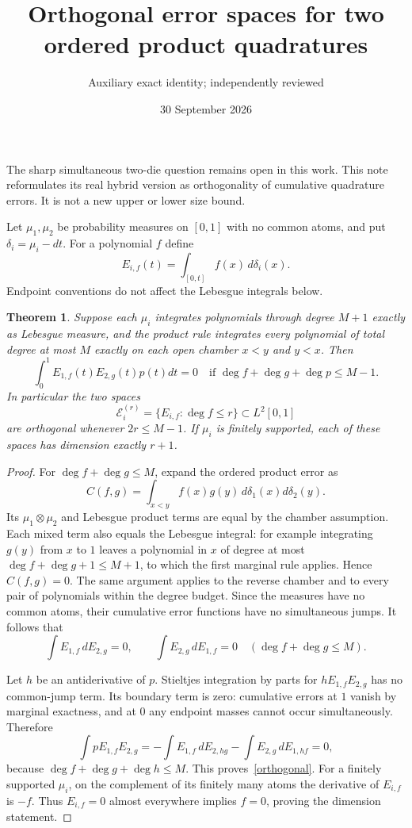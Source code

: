 \documentclass[11pt]{article}
\title{Orthogonal error spaces for two ordered product quadratures}
\author{Auxiliary exact identity; independently reviewed}\date{30 September 2026}
\newtheorem{theorem}{Theorem}\newtheorem{corollary}{Corollary}
\begin{document}
\maketitle
The sharp simultaneous two-die question remains open in this work.
This note reformulates its real hybrid version as orthogonality of
cumulative quadrature errors. It is not a new upper or lower size bound.

Let $\mu_1,\mu_2$ be probability measures on $[0,1]$ with no common
atoms, and put $\delta_i=\mu_i-dt$. For a polynomial $f$ define
\[
 E_{i,f}(t)=\int_{[0,t]}f(x)\,d\delta_i(x).
\]
Endpoint conventions do not affect the Lebesgue integrals below.

\begin{theorem}\label{main}
Suppose each $\mu_i$ integrates polynomials through degree $M+1$
exactly as Lebesgue measure, and the product rule integrates every
polynomial of total degree at most $M$ exactly on each open chamber
$x<y$ and $y<x$. Then
\begin{equation}\label{orthogonal}
 \int_0^1 E_{1,f}(t)E_{2,g}(t)p(t)dt=0
 \quad\text{if }\deg f+\deg g+\deg p\le M-1.
\end{equation}
In particular the two spaces
\[
 \mathcal E_i^{(r)}=\{E_{i,f}:\deg f\le r\}\subset L^2[0,1]
\]
are orthogonal whenever $2r\le M-1$. If $\mu_i$ is finitely supported,
each of these spaces has dimension exactly $r+1$.
\end{theorem}
\begin{proof}
For $\deg f+\deg g\le M$, expand the ordered product error as
\[
 C(f,g)=\int_{x<y}f(x)g(y)\,d\delta_1(x)d\delta_2(y).
\]
Its $\mu_1\otimes\mu_2$ and Lebesgue product terms are equal by the
chamber assumption. Each mixed term also equals the Lebesgue integral:
for example integrating $g(y)$ from $x$ to $1$ leaves a polynomial
in $x$ of degree at most $\deg f+\deg g+1\le M+1$, to which the
first marginal rule applies. Hence $C(f,g)=0$.
The same argument applies to the reverse chamber and to every pair
of polynomials within the degree budget. Since the measures have no
common atoms, their cumulative error functions have no simultaneous
jumps. It follows that
\[
 \int E_{1,f}\,dE_{2,g}=0,\qquad
 \int E_{2,g}\,dE_{1,f}=0
 \quad(\deg f+\deg g\le M).
\]

Let $h$ be an antiderivative of $p$. Stieltjes integration by parts
for $h E_{1,f}E_{2,g}$ has no common-jump term. Its boundary term is
zero: cumulative errors at $1$ vanish by marginal exactness, and at
$0$ any endpoint masses cannot occur simultaneously. Therefore
\[
 \int p E_{1,f}E_{2,g}
 =-\int E_{1,f}\,dE_{2,hg}
  -\int E_{2,g}\,dE_{1,hf}=0,
\]
because $\deg f+\deg g+\deg h\le M$. This proves~\eqref{orthogonal}.
For a finitely supported $\mu_i$, on the complement of its finitely
many atoms the derivative of $E_{i,f}$ is $-f$. Thus $E_{i,f}=0$
almost everywhere implies $f=0$, proving the dimension statement.
\end{proof}
\end{document}
